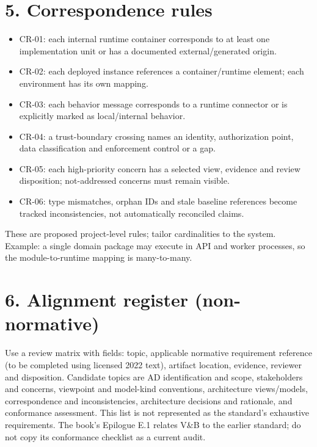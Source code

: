 \documentclass[11pt,letterpaper]{article}
\begin{document}
\section*{5. Correspondence rules}
\begin{itemize}
\item CR-01: each internal runtime container corresponds to at least one implementation unit or has a documented external/generated origin.
\item CR-02: each deployed instance references a container/runtime element; each environment has its own mapping.
\item CR-03: each behavior message corresponds to a runtime connector or is explicitly marked as local/internal behavior.
\item CR-04: a trust-boundary crossing names an identity, authorization point, data classification and enforcement control or a gap.
\item CR-05: each high-priority concern has a selected view, evidence and review disposition; not-addressed concerns must remain visible.
\item CR-06: type mismatches, orphan IDs and stale baseline references become tracked inconsistencies, not automatically reconciled claims.
\end{itemize}
These are proposed project-level rules; tailor cardinalities to the system. Example: a single domain package may execute in API and worker processes, so the module-to-runtime mapping is many-to-many.\par\smallskip
\section*{6. Alignment register (non-normative)}
Use a review matrix with fields: topic, applicable normative requirement reference (to be completed using licensed 2022 text), artifact location, evidence, reviewer and disposition. Candidate topics are AD identification and scope, stakeholders and concerns, viewpoint and model-kind conventions, architecture views/models, correspondence and inconsistencies, architecture decisions and rationale, and conformance assessment. This list is not represented as the standard's exhaustive requirements. The book's Epilogue E.1 relates V\&B to the earlier standard; do not copy its conformance checklist as a current audit.\par\smallskip
\end{document}
